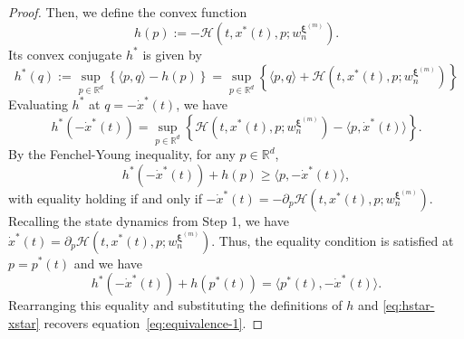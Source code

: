 \documentclass[11pt]{article}
\numberwithin{equation}{section}
\theoremstyle{plain}
\theoremstyle{definition}
\theoremstyle{remark}
\newcommand{\R}{\mathbb{R}}
\begin{document}
\begin{proof}
Then, we define the convex function 
\begin{equation*}
    h(p) := -\mathcal{H}(t,x^*(t),p;w_n^{\bm{\xi}^{(m)}}). 
\end{equation*}
Its convex conjugate $h^*$ is given by 
\begin{equation*}
    h^*(q) := \sup_{p\in \mathbb{R}^d}\left\{ \langle p, q\rangle - h(p) \right\} = \sup_{p\in \R^d}\left\{ \langle p, q\rangle +\mathcal{H}(t,x^*(t), p;w_n^{\bm{\xi}^{(m)}}) \right\}
\end{equation*}
Evaluating $h^*$ at $q = -\dot{x}^*(t)$, we have 
\begin{equation}
\label{eq:hstar-xstar}
    h^*(-\dot{x}^*(t)) = \sup_{p\in \R^d} \left\{ \mathcal{H}(t,x^*(t), p;w_n^{\bm{\xi}^{(m)}}) - \langle p, \dot{x}^*(t)\rangle \right\}. 
\end{equation}
By the Fenchel-Young inequality, for any $p\in \R^d$, 
\begin{equation*}
    h^*(-\dot{x}^*(t)) + h(p) \ge \langle p, -\dot{x}^*(t) \rangle, 
\end{equation*}
with equality holding if and only if $-\dot{x}^*(t) =  -\partial_p \mathcal{H}(t,x^*(t),p;w_n^{\bm{\xi}^{(m)}})$. 
Recalling the state dynamics from Step 1, we have $\dot{x}^*(t) =  \partial_p \mathcal{H}(t,x^*(t),p;w_n^{\bm{\xi}^{(m)}})$. 
Thus, the equality condition is satisfied at $p = p^*(t)$ and we have 
\begin{equation*}
    h^*(-\dot{x}^*(t)) + h(p^*(t)) = \langle p^*(t), -\dot{x}^*(t) \rangle.
\end{equation*}
Rearranging this equality and substituting the definitions of $h$ and \eqref{eq:hstar-xstar} recovers equation~\eqref{eq:equivalence-1}. 


\end{proof}
\end{document}
